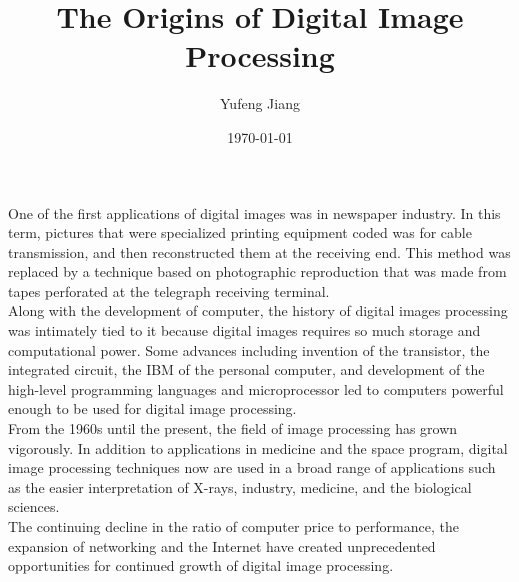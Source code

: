 \documentclass[11pt,oneside]{article}
\title{The Origins of Digital Image Processing}
\author{Yufeng Jiang}
\date{\today}
\begin{document}
\maketitle
One of the first applications of digital images was in newspaper industry. In this term, pictures that were specialized printing equipment coded was for cable transmission, and then reconstructed them at the receiving end. This method was replaced by a technique based on photographic reproduction that was made from tapes perforated at the telegraph receiving terminal.\\
\indent Along with the development of computer, the history of digital images processing was intimately tied to it because digital images requires so much storage and computational power. Some advances including invention of the transistor, the integrated circuit, the IBM of the personal computer, and development of the high-level programming languages and microprocessor led to computers powerful enough to be used for digital image processing. \\
\indent From the 1960s until the present, the field of image processing has grown vigorously. In addition to applications in medicine and the space program, digital image processing techniques now are used in a broad range of applications such as the easier interpretation of X-rays, industry, medicine, and the biological sciences. \\
\indent The continuing decline in the ratio of computer price to performance, the expansion of networking and the Internet have created unprecedented opportunities for continued growth of digital image processing.
\end{document}
